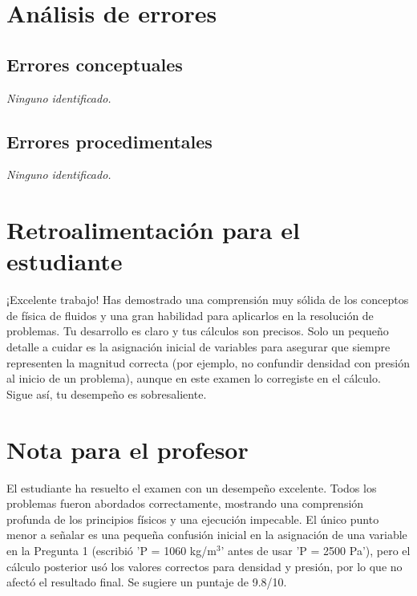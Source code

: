 \documentclass[11pt,a4paper]{article}
\begin{document}
\section*{Análisis de errores}

\subsection*{Errores conceptuales}
\textit{Ninguno identificado.}

\subsection*{Errores procedimentales}
\textit{Ninguno identificado.}

\section*{Retroalimentación para el estudiante}
\begin{tcolorbox}[cajaRecomendacion, title={Dirigido a: camila cabrera 32937064}]
¡Excelente trabajo! Has demostrado una comprensión muy sólida de los conceptos de física de fluidos y una gran habilidad para aplicarlos en la resolución de problemas. Tu desarrollo es claro y tus cálculos son precisos. Solo un pequeño detalle a cuidar es la asignación inicial de variables para asegurar que siempre representen la magnitud correcta (por ejemplo, no confundir densidad con presión al inicio de un problema), aunque en este examen lo corregiste en el cálculo. Sigue así, tu desempeño es sobresaliente.
\end{tcolorbox}

\section*{Nota para el profesor}
\begin{tcolorbox}[
  enhanced, breakable,
  colback=yellow!8, colframe=yellow!60!black,
  fonttitle=\bfseries, coltitle=black,
  title={Observaciones para revisión manual},
  top=4pt, bottom=4pt, left=8pt, right=8pt,
]
El estudiante ha resuelto el examen con un desempeño excelente. Todos los problemas fueron abordados correctamente, mostrando una comprensión profunda de los principios físicos y una ejecución impecable. El único punto menor a señalar es una pequeña confusión inicial en la asignación de una variable en la Pregunta 1 (escribió 'P = 1060 kg/m$^{3}$' antes de usar 'P = 2500 Pa'), pero el cálculo posterior usó los valores correctos para densidad y presión, por lo que no afectó el resultado final. Se sugiere un puntaje de 9.8/10.
\end{tcolorbox}
\end{document}
